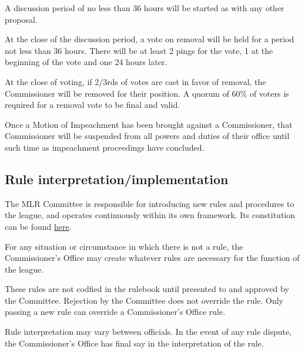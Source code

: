 \begin{deepEnumerate}
\begin{deepEnumerate}
\begin{deepEnumerate}
			A discussion period of no less than 36 hours will be started 
			as with any other proposal.
			\item At the close of the discussion period, 
			a vote on removal will be held for a period not less than 36 hours. 
			There will be at least 2 pings for the vote, 
			1 at the beginning of the vote and one 24 hours later.
			\item At the close of voting,
			if 2/3rds of votes are cast in favor of removal, 
			the Commissioner will be removed for their position. 
			A quorum of 60\% of voters is required 
			for a removal vote to be final and valid.
		\end{deepEnumerate}
		\item Once a Motion of Impeachment has been brought against a Commissioner, 
		that Commissioner will be suspended from all powers and duties of their office 
		until such time as impeachment proceedings have concluded.
	\end{deepEnumerate}
\end{deepEnumerate}

\subsection{Rule interpretation/implementation}
\begin{deepEnumerate}
	\item The MLR Committee is responsible for introducing new rules and procedures to the league, and operates continuously within its own framework.
	Its constitution can be found \href{https://docs.google.com/document/d/1_bd2r2KycOuCXXBswZ_7yTmSPYdP5W_ju41N0fB13nM/edit}{here}.
	\item For any situation or circumstance in which there is not a rule, the Commissioner's Office may create whatever rules are necessary
	for the function of the league.
	\begin{deepEnumerate}
		\item These rules are not codfied in the rulebook until presented to and approved by the Committee.
		Rejection by the Committee does not override the rule. Only passing a new rule can override a Commissioner's Office rule.
	\end{deepEnumerate}
	\item Rule interpretation may vary between officials. In the event of any rule dispute, the Commissioner’s Office has final say in the interpretation of the rule.
\end{deepEnumerate}

